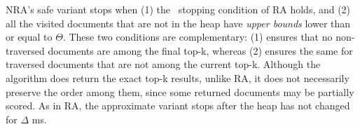 NRA's safe variant stops when (1) the \RAStop\ stopping condition of RA holds, 
and (2) all the  visited documents that are not in the heap have \emph{upper bounds} lower than or equal to $\Theta$. These two conditions are complementary: (1) ensures that no non-traversed documents are among the final top-k, whereas (2) ensures the same for  traversed documents that are not among the current top-k. 
Although the algorithm does return the exact top-k results, unlike RA, it does not necessarily preserve the order among them, since some returned documents may be partially scored. As in RA, the approximate variant  stops after the heap has not changed for $\Delta$ ms.

